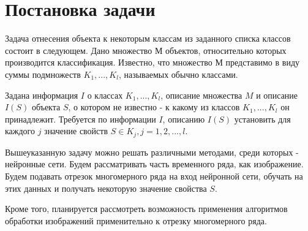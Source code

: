 \documentclass{article}
\begin{document}
\newpage
\section{Постановка задачи}
\par{
Задача отнесения объекта к некоторым классам из заданного списка классов состоит в следующем. Дано множество М объектов, относительно которых производится классификация. Известно, что множество М представимо в виду суммы подмножеств $K_1,...,K_l$, называемых обычно классами. 
}

\par{
Задана информация $I$ о классах $K_1,...,K_l$, описание множества $M$ и описание $I(S)$ объекта $S$, о котором не известно - к какому из классов $K_1,...,K_l$ он принадлежит. Требуется по информации $I$, описанию $I(S)$ установить для каждого $j$ значение свойств $S \in K_j, j=1,2,...,l$. \cite{zhuravlev78}
}

\par{
Вышеуказанную задачу можно решать различными методами, среди которых - нейронные сети. Будем рассматривать часть временного ряда, как изображение. Будем подавать отрезок многомерного ряда на вход нейронной сети, обучать на этих данных и получать некоторую значение свойства $S$.
}

\par{
Кроме того, планируется рассмотреть возможность применения алгоритмов обработки изображений применительно к отрезку многомерного ряда. 
}

\newpage


\end{document}
